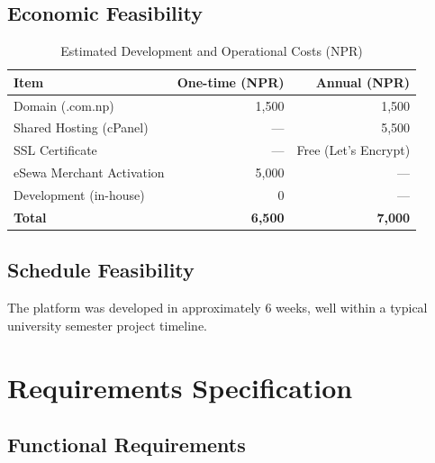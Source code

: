 \documentclass[12pt,a4paper]{report}
\begin{document}
\subsection{Economic Feasibility}
\begin{table}[H]
\centering
\caption{Estimated Development and Operational Costs (NPR)}
\begin{tabular}{@{}lrr@{}}
\toprule
\textbf{Item} & \textbf{One-time (NPR)} & \textbf{Annual (NPR)} \\
\midrule
Domain (.com.np)          & 1,500  & 1,500  \\
Shared Hosting (cPanel)   & —      & 5,500  \\
SSL Certificate           & —      & Free (Let's Encrypt) \\
eSewa Merchant Activation & 5,000  & — \\
Development (in-house)    & 0      & — \\
\midrule
\textbf{Total}            & \textbf{6,500} & \textbf{7,000} \\
\bottomrule
\end{tabular}
\end{table}

\subsection{Schedule Feasibility}
The platform was developed in approximately 6 weeks, well within a typical university semester project timeline.

\section{Requirements Specification}

\subsection{Functional Requirements}
\end{document}
